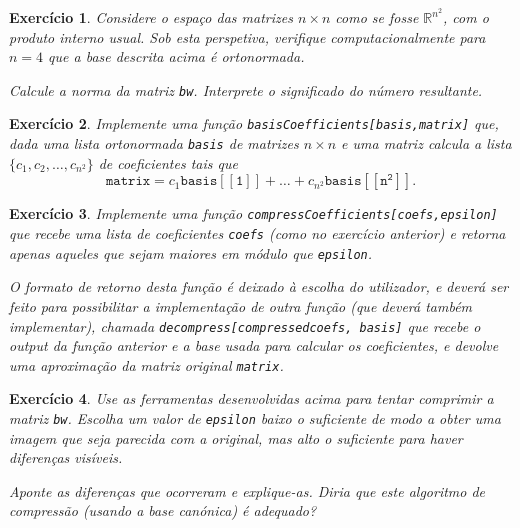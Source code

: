 \documentclass{article}
\newtheorem{ex}{Exercício}
\newcommand{\R}{\mathbb{R}}
\begin{document}
\begin{ex}
Considere o espaço das matrizes $n \times n$ como se fosse $\R^{n^2}$, com o produto interno usual. Sob esta perspetiva, verifique computacionalmente para $n=4$ que a base descrita acima é ortonormada.

Calcule a norma da matriz \texttt{bw}. Interprete o significado do número resultante.
\end{ex}

\begin{ex}
Implemente uma função \texttt{basisCoefficients[basis,matrix]} que, dada uma lista \emph{ortonormada} \texttt{basis} de matrizes $n \times n$ e uma matriz calcula a lista $\{c_1, c_2, \dots, c_{n^2}\}$ de coeficientes tais que
\[\mathtt{matrix} = c_1 \mathtt{basis[[1]]} + \dots + c_{n^2} \mathtt{basis[[n^2]]}.\]
\end{ex}

\begin{ex}
Implemente uma função \texttt{compressCoefficients[coefs,epsilon]} que recebe uma lista de coeficientes \texttt{coefs} (como no exercício anterior) e retorna apenas aqueles que sejam maiores em módulo que \texttt{epsilon}.

O formato de retorno desta função é deixado à escolha do utilizador, e deverá ser feito para possibilitar a implementação de outra função (que deverá também implementar), chamada \texttt{decompress[compressedcoefs, basis]} que recebe o output da função anterior e a base usada para calcular os coeficientes, e devolve uma aproximação da matriz original \texttt{matrix}.
\end{ex}

\begin{ex}\label{excomprimir}
Use as ferramentas desenvolvidas acima para tentar comprimir a matriz \texttt{bw}. Escolha um valor de \texttt{epsilon} baixo o suficiente de modo a obter uma imagem que seja parecida com a original, mas alto o suficiente para haver diferenças visíveis.

Aponte as diferenças que ocorreram e explique-as. Diria que este algoritmo de compressão (usando a base canónica) é adequado?
\end{ex}
\end{document}
